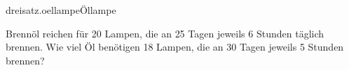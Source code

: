 \begin{exercise}{dreisatz.oellampe}{Öllampe}
  \ifproblem\problem\par
     Brennöl reichen für 20 Lampen, die an 25 Tagen jeweils 6 Stunden
    täglich brennen. Wie viel Öl benötigen 18 Lampen, die an 30 Tagen jeweils
    5 Stunden brennen?
  \fi
\end{exercise}
